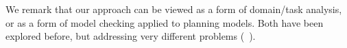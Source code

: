 We remark that our approach can be viewed as a form of domain/task
analysis, or as a form of model checking applied to planning
models. Both have been explored before, but addressing very different
problems
(\eg\ \cite{fox:long:jair-98,rintanen:aaai-00,vaquero:etal:keq-13}).
%
%




















